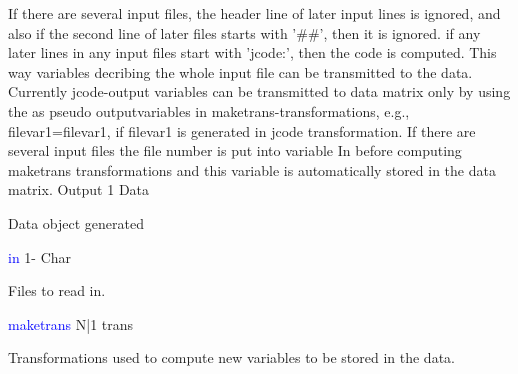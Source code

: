 If there are several input files, the header line of later input lines is ignored, and
also if the second line of later files starts with '\#\#', then it is ignored.
if any later lines in any input files start with 'jcode:', then the code is computed.
This way variables decribing the whole input file can be transmitted to the data.
Currently jcode-output variables can be transmitted to data matrix only by using the as pseudo
outputvariables in maketrans-transformations, e.g., filevar1=filevar1, if
filevar1 is generated in jcode transformation.
If there are several input files the file number is put into variable In before computing maketrans transformations
and this variable is automatically stored in the data matrix.
\vspace{0.3cm}
\hline
\vspace{0.3cm}
\noindent Output \tabto{3cm} 1 \tabto{5cm}  Data \tabto{7cm}
\begin{changemargin}{3cm}{0cm}
\noindent  Data object generated
\end{changemargin}
\vspace{0.3cm}
\hline
\vspace{0.3cm}
\noindent \textcolor{blue}{in} \tabto{3cm} 1- \tabto{5cm}  Char \tabto{7cm}
\begin{changemargin}{3cm}{0cm}
\noindent Files to read in.
\end{changemargin}
\vspace{0.3cm}
\hline
\vspace{0.3cm}
\noindent \textcolor{blue}{maketrans} \tabto{3cm} N|1 \tabto{5cm}  trans \tabto{7cm}
\begin{changemargin}{3cm}{0cm}
\noindent  Transformations used to compute new variables to be stored
in the data.
\end {changemargin}
\hline
\vspace{0.2cm}
